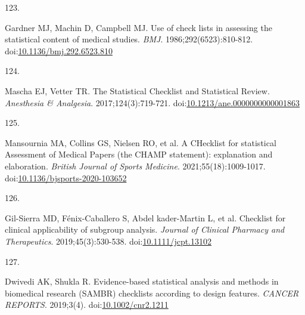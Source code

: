 \documentclass[
]{book}
\newlength{\cslhangindent}
\newlength{\csllabelwidth}
\newlength{\cslentryspacingunit} %
\newenvironment{CSLReferences}[2] %
 {%
  \setlength{\parindent}{0pt}
  \ifodd #1
  \let\oldpar\par
  \def\par{\hangindent=\cslhangindent\oldpar}
  \fi
  \setlength{\parskip}{#2\cslentryspacingunit}
 }%
 {}
\newcommand{\CSLLeftMargin}[1]{\parbox[t]{\csllabelwidth}{#1}}
\newcommand{\CSLRightInline}[1]{\parbox[t]{\linewidth - \csllabelwidth}{#1}\break}
\begin{document}
\begin{CSLReferences}{0}{0}
\leavevmode{}%
\CSLLeftMargin{123. }%
\CSLRightInline{Gardner MJ, Machin D, Campbell MJ. Use of check lists in assessing the statistical content of medical studies. \emph{BMJ}. 1986;292(6523):810-812. doi:\href{https://doi.org/10.1136/bmj.292.6523.810}{10.1136/bmj.292.6523.810}}

\leavevmode{}%
\CSLLeftMargin{124. }%
\CSLRightInline{Mascha EJ, Vetter TR. The Statistical Checklist and Statistical Review. \emph{Anesthesia \& Analgesia}. 2017;124(3):719-721. doi:\href{https://doi.org/10.1213/ane.0000000000001863}{10.1213/ane.0000000000001863}}

\leavevmode{}%
\CSLLeftMargin{125. }%
\CSLRightInline{Mansournia MA, Collins GS, Nielsen RO, et al. A CHecklist for statistical Assessment of Medical Papers (the CHAMP statement): explanation and elaboration. \emph{British Journal of Sports Medicine}. 2021;55(18):1009-1017. doi:\href{https://doi.org/10.1136/bjsports-2020-103652}{10.1136/bjsports-2020-103652}}

\leavevmode{}%
\CSLLeftMargin{126. }%
\CSLRightInline{Gil-Sierra MD, Fénix-Caballero S, Abdel kader-Martin L, et al. Checklist for clinical applicability of subgroup analysis. \emph{Journal of Clinical Pharmacy and Therapeutics}. 2019;45(3):530-538. doi:\href{https://doi.org/10.1111/jcpt.13102}{10.1111/jcpt.13102}}

\leavevmode{}%
\CSLLeftMargin{127. }%
\CSLRightInline{Dwivedi AK, Shukla R. Evidence{-}based statistical analysis and methods in biomedical research (SAMBR) checklists according to design features. \emph{CANCER REPORTS}. 2019;3(4). doi:\href{https://doi.org/10.1002/cnr2.1211}{10.1002/cnr2.1211}}

\end{CSLReferences}
\end{document}
